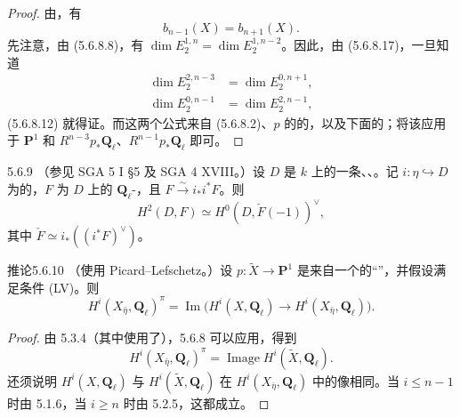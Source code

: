 \begin{proof}
由，有
\begin{equation}\tag{5.6.8.17}b_{n-1}(X)=b_{n+1}(X).\end{equation}
先注意，由 (5.6.8.8)，有 $\dim E_2^{1,n}=\dim E_2^{1,n-2}$。因此，由 (5.6.8.17)，一旦知道
\begin{align}
\dim E_2^{2,n-3}&=\dim E_2^{0,n+1},\tag{5.6.8.18}\\
\dim E_2^{0,n-1}&=\dim E_2^{2,n-1},\tag{5.6.8.19}
\end{align}
(5.6.8.12) 就得证。而这两个公式来自 (5.6.8.2)、$p$ 的的，以及下面的；将该应用于 $\mathbf P^1$ 和 $R^{n-3}p_*\mathbf Q_\ell$、$R^{n-1}p_*\mathbf Q_\ell$ 即可。
\end{proof}
\begin{SGAresult}{}{5.6.9}
（参见 SGA 5 I \S5 及 SGA 4 XVIII。）设 $D$ 是 $k$ 上的一条、、。记 $i:\eta\hookrightarrow D$ 为的，$F$ 为 $D$ 上的 $\mathbf Q_\ell$-，且 $F\xrightarrow{\sim}i_*i^*F$。则
\[H^2(D,F)\simeq H^0(D,\check F(-1))^\vee,\]
其中 $\check F\simeq i_*((i^*F)^\vee)$。
\end{SGAresult}
\begin{SGAresult}{推论}{5.6.10}
（使用 Picard--Lefschetz。）设 $p:\widetilde X\to\mathbf P^1$ 是来自一个的“”，并假设满足条件 (LV)。则
\begin{equation}\tag{5.6.10.1}H^i(X_{\bar\eta},\mathbf Q_\ell)^\pi=\operatorname{Im}\bigl(H^i(X,\mathbf Q_\ell)\to H^i(X_{\bar\eta},\mathbf Q_\ell)\bigr).\end{equation}
\end{SGAresult}
\begin{proof}
由 5.3.4（其中使用了），5.6.8 可以应用，得到
\[H^i(X_{\bar\eta},\mathbf Q_\ell)^\pi=\operatorname{Image}H^i(\widetilde X,\mathbf Q_\ell).\]
还须说明 $H^i(X,\mathbf Q_\ell)$ 与 $H^i(\widetilde X,\mathbf Q_\ell)$ 在 $H^i(X_{\bar\eta},\mathbf Q_\ell)$ 中的像相同。当 $i\leq n-1$ 时由 5.1.6，当 $i\geq n$ 时由 5.2.5，这都成立。
\end{proof}
